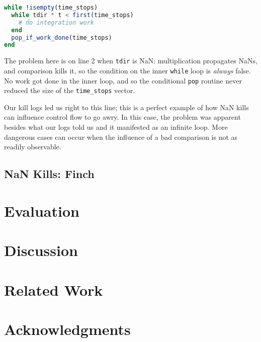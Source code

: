 \documentclass{juliacon}
\begin{document}
\begin{lstlisting}[language = Julia]
while !isempty(time_stops)
  while tdir * t < first(time_stops)
    # do integration work
  end
  pop_if_work_done(time_stops)
end
\end{lstlisting}

The problem here is on line 2 when \texttt{tdir} is NaN: multiplication propagates NaNs, and comparison kills it, so the condition on the inner \texttt{while} loop is \emph{always} false.
No work got done in the inner loop, and so the conditional \texttt{pop} routine never reduced the size of the \texttt{time\_stops} vector.

Our kill logs led us right to this line; this is a perfect example of how NaN kills can influence control flow to go awry.
In this case, the problem was apparent besides what our logs told us and it manifested as an infinite loop.
More dangerous cases can occur when the influence of a bad comparison is not as readily observable.

\subsection{NaN Kills: Finch}


\section{Evaluation}

\section{Discussion}

\section{Related Work}

\section{Acknowledgments}


\end{document}
